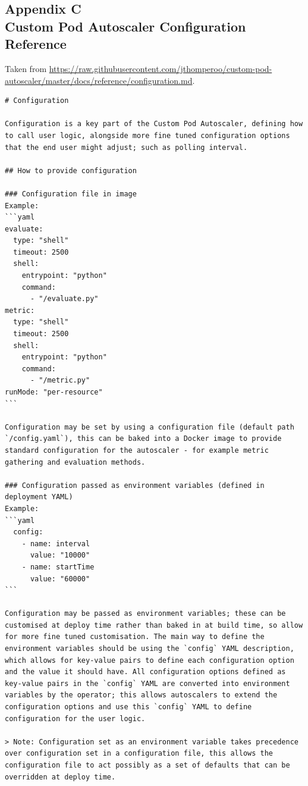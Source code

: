\subsection*{%
    Appendix C \\
    \small Custom Pod Autoscaler Configuration Reference}

Taken from \url{https://raw.githubusercontent.com/jthomperoo/custom-pod-autoscaler/master/docs/reference/configuration.md}.

\begin{lstlisting}
# Configuration

Configuration is a key part of the Custom Pod Autoscaler, defining how to call user logic, alongside more fine tuned configuration options that the end user might adjust; such as polling interval.

## How to provide configuration

### Configuration file in image
Example:  
```yaml
evaluate: 
  type: "shell"
  timeout: 2500
  shell: 
    entrypoint: "python"
    command: 
      - "/evaluate.py"
metric: 
  type: "shell"
  timeout: 2500
  shell: 
    entrypoint: "python"
    command: 
      - "/metric.py"
runMode: "per-resource"
```

Configuration may be set by using a configuration file (default path `/config.yaml`), this can be baked into a Docker image to provide standard configuration for the autoscaler - for example metric gathering and evaluation methods.

### Configuration passed as environment variables (defined in deployment YAML)
Example:  
```yaml
  config: 
    - name: interval
      value: "10000"
    - name: startTime
      value: "60000"
```

Configuration may be passed as environment variables; these can be customised at deploy time rather than baked in at build time, so allow for more fine tuned customisation. The main way to define the environment variables should be using the `config` YAML description, which allows for key-value pairs to define each configuration option and the value it should have. All configuration options defined as key-value pairs in the `config` YAML are converted into environment variables by the operator; this allows autoscalers to extend the configuration options and use this `config` YAML to define configuration for the user logic. 

> Note: Configuration set as an environment variable takes precedence over configuration set in a configuration file, this allows the configuration file to act possibly as a set of defaults that can be overridden at deploy time.


\end{lstlisting}

